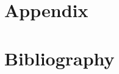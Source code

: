 \documentclass[twoside,12pt,onecolumn]{Latex/Classes/PhDthesisPSnPDF}
\begin{document}
\backmatter



\appendix
\part{Appendix}
\label{sec:appendix}


%








\part{Bibliography}
\label{sec:bibliography}
%


\end{document}
